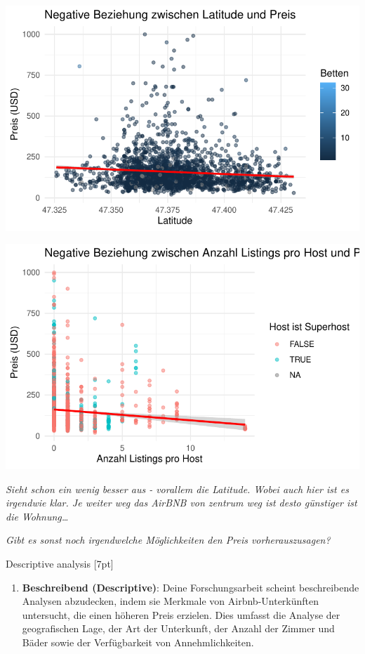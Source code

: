 \documentclass[
  journal,
]{IEEEtran}%
\providecommand{\tightlist}{%
  \setlength{\itemsep}{0pt}\setlength{\parskip}{0pt}}\usepackage{longtable,booktabs,array}
\begin{document}
\includegraphics{main_files/figure-pdf/unnamed-chunk-8-2.pdf}

\includegraphics{main_files/figure-pdf/unnamed-chunk-8-3.pdf}

\emph{Sieht schon ein wenig besser aus - vorallem die Latitude. Wobei
auch hier ist es irgendwie klar. Je weiter weg das AirBNB von zentrum
weg ist desto günstiger ist die Wohnung\ldots{}}

\emph{Gibt es sonst noch irgendwelche Möglichkeiten den Preis
vorherauszusagen?}

Descriptive analysis {[}7pt{]}

\begin{enumerate}
\def\labelenumi{\arabic{enumi}.}
\tightlist
\item
  \textbf{Beschreibend (Descriptive)}: Deine Forschungsarbeit scheint
  beschreibende Analysen abzudecken, indem sie Merkmale von
  Airbnb-Unterkünften untersucht, die einen höheren Preis erzielen. Dies
  umfasst die Analyse der geografischen Lage, der Art der Unterkunft,
  der Anzahl der Zimmer und Bäder sowie der Verfügbarkeit von
  Annehmlichkeiten.
\end{enumerate}
\end{document}
